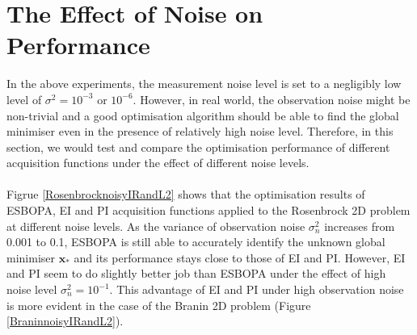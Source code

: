 \documentclass[a4paper,11pt]{report}
\begin{document}
\section{The Effect of Noise on Performance}
In the above experiments, the measurement noise level is set to a negligibly low level of $\sigma^2=10^{-3}$ or $10^{-6}$. However, in real world, the observation noise might be non-trivial and a good optimisation algorithm should be able to find the global minimiser even in the presence of relatively high noise level. Therefore, in this section, we would test and compare the optimisation performance of different acquisition functions under the effect of different noise levels. 
\\\\
Figrue \ref{RosenbrocknoisyIRandL2} shows that the optimisation results of ESBOPA, EI and PI acquisition functions applied to the Rosenbrock 2D problem at different noise levels. As the variance of observation noise $\sigma_n^2$ increases from 0.001 to 0.1, ESBOPA is still able to accurately identify the unknown global minimiser $\mathbf{x}_*$ and its performance stays close to those of EI and PI. However, EI and PI seem to do slightly better job than ESBOPA under the effect of high noise level $\sigma_n^2= 10^{-1}$. This advantage of EI and PI under high observation noise is more evident in the case of the Branin 2D problem (Figure \ref{BraninnoisyIRandL2}). 
\\
\end{document}
